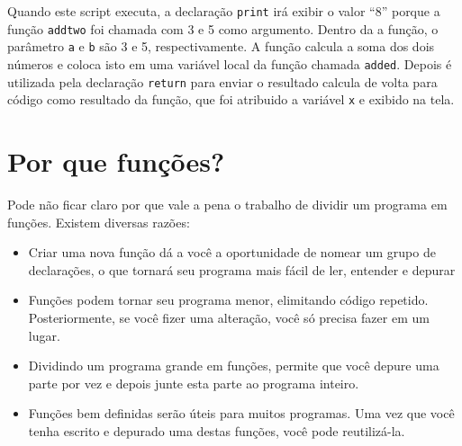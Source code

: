 Quando este script executa, a declaração {\tt print} irá exibir o valor ``8''
porque a função {\tt addtwo} foi chamada com 3 e 5 como argumento. Dentro da
a função, o parâmetro {\tt a} e {\tt b} são 3 e 5, respectivamente. A função
calcula a soma dos dois números e coloca isto em uma variável local da função
chamada {\tt added}. Depois é utilizada pela declaração {\tt return} para
enviar o resultado calcula de volta para código como resultado da função, que
foi atribuido a variável {\tt x} e exibido na tela.

\section{Por que funções?}


Pode não ficar claro por que vale a pena o trabalho de dividir um programa
em funções. Existem diversas razões:

\begin{itemize}


\item Criar uma nova função dá a você a oportunidade de nomear um grupo de
declarações, o que tornará seu programa mais fácil de ler, entender e
depurar


\item Funções podem tornar seu programa menor, elimitando código repetido.
Posteriormente, se você fizer uma alteração, você só precisa fazer em um
lugar.


\item Dividindo um programa grande em funções, permite que você depure uma
parte por vez e depois junte esta parte ao programa inteiro.


\item Funções bem definidas serão úteis para muitos programas. Uma vez que
você tenha escrito e depurado uma destas funções, você pode reutilizá-la.
\end{itemize}

